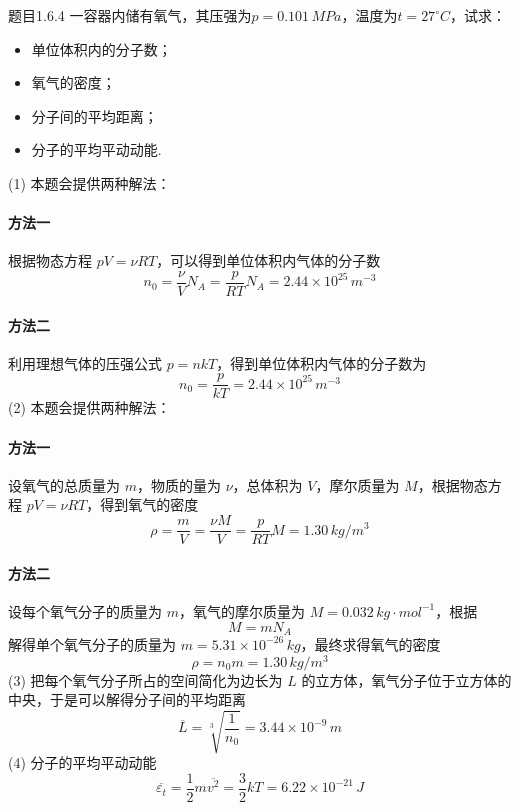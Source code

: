 \begin{question}{题目1.6.4}
    一容器内储有氧气，其压强为$p = 0.101\,\si{MPa}$，温度为$t = 27^\circ C$，试求：
    \begin{itemize}
        \item[(1)] 单位体积内的分子数；
        \item[(2)] 氧气的密度；
        \item[(3)] 分子间的平均距离；
        \item[(4)] 分子的平均平动动能.
    \end{itemize}
\end{question}
\begin{solution}
    (1) 本题会提供两种解法：
    \paragraph{方法一} \quad 根据物态方程 $pV = \nu RT$，可以得到单位体积内气体的分子数
    $$
        n_0 = \frac{\nu}{V}N_A = \frac{p}{RT}N_A = 2.44 \times 10^{25} \,\si{m^{-3}}
    $$
    \paragraph{方法二} 利用理想气体的压强公式 $p=nkT$，得到单位体积内气体的分子数为
    $$
        n_0 = \frac{p}{kT} = 2.44 \times 10^{25}\,\si{m^{-3}}
    $$
    (2) 本题会提供两种解法：
    \paragraph{方法一} \quad 设氧气的总质量为 $m$，物质的量为 $\nu$，总体积为 $V$，摩尔质量为 $M$，根据物态方程 $pV = \nu RT$，得到氧气的密度
    $$
        \rho = \frac{m}{V}
        = \frac{\nu M}{V}
        = \frac{p}{RT}M
        = 1.30 \,\si{kg/m^3}
    $$
    \paragraph{方法二} 设每个氧气分子的质量为 $m$，氧气的摩尔质量为 $M = 0.032 \,\si{kg \cdot mol^{-1}}$，根据
    $$
        M = mN_A
    $$
    解得单个氧气分子的质量为 $m = 5.31 \times 10^{-26} \,\si{kg}$，最终求得氧气的密度
    $$
        \rho = n_0m = 1.30 \,\si{kg/m^3}
    $$
    (3) 把每个氧气分子所占的空间简化为边长为 $L$ 的立方体，氧气分子位于立方体的中央，于是可以解得分子间的平均距离
    $$
        \overline{L} = \sqrt[3]{\frac{1}{n_0}} = 3.44 \times 10^{-9} \,\si{m}
    $$
    (4) 分子的平均平动动能
    $$
        \overline{\varepsilon_t} = \frac{1}{2}m\overline{v^2} = \frac{3}{2}kT = 6.22 \times 10^{-21} \,\si{J}
    $$
\end{solution}

